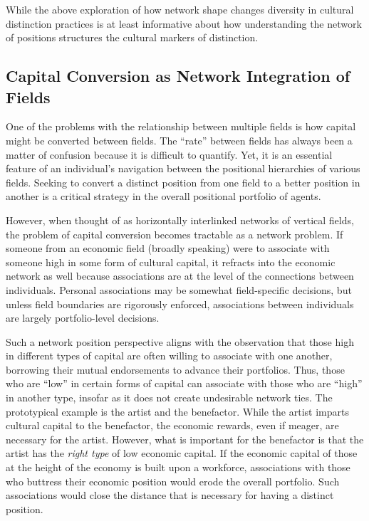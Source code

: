 \documentclass[12pt]{article}
\begin{document}
While the above exploration of how network shape changes diversity in cultural distinction practices is at least informative about how understanding the network of positions structures the cultural markers of distinction. 

\subsection{Capital Conversion as Network Integration of Fields}
One of the problems with the relationship between multiple fields is how capital might be converted between fields. The ``rate'' between fields has always been a matter of confusion because it is difficult to quantify. Yet, it is an essential feature of an individual's navigation between the positional hierarchies of various fields. Seeking to convert a distinct position from one field to a better position in another is a critical strategy in the overall positional portfolio of agents.

However, when thought of as horizontally interlinked networks of vertical fields, the problem of capital conversion becomes tractable as a network problem. If someone from an economic field (broadly speaking) were to associate with someone high in some form of cultural capital, it refracts into the economic network as well because associations are at the level of the connections between individuals. Personal associations may be somewhat field-specific decisions, but unless field boundaries are rigorously enforced, associations between individuals are largely portfolio-level decisions. 

Such a network position perspective aligns with the observation that those high in different types of capital are often willing to associate with one another, borrowing their mutual endorsements to advance their portfolios. Thus, those who are ``low'' in certain forms of capital can associate with those who are ``high'' in another type, insofar as it does not create undesirable network ties. The prototypical example is the artist and the benefactor. While the artist imparts cultural capital to the benefactor, the economic rewards, even if meager, are necessary for the artist. However, what is important for the benefactor is that the artist has the \textit{right type} of low economic capital. If the economic capital of those at the height of the economy is built upon a workforce, associations with those who buttress their economic position would erode the overall portfolio. Such associations would close the distance that is necessary for having a distinct position. 
\end{document}
